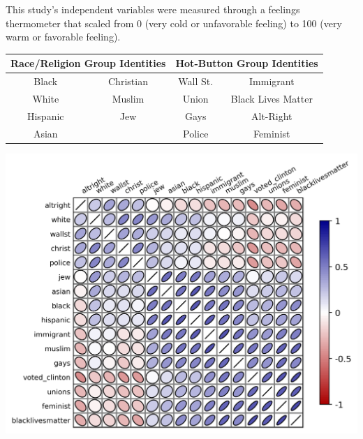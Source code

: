 \documentclass[a0,portrait]{a0poster}
\begin{document}
\begin{multicols}{2}
This study's independent variables were measured through a feelings thermometer that scaled from 0 (very cold or unfavorable feeling) to 100 (very warm or favorable feeling).

\begin{center}
  \begin{tabular}{|cc|cc|} \hline
    \multicolumn{2}{|c|}{\color{DarkMagenta}Race/Religion Group Identities} & \multicolumn{2}{|c|}{\color{CornflowerBlue}Hot-Button Group Identities} \\ \hline
    Black & Christian & Wall St. & Immigrant \\
    White & Muslim &  Union & Black Lives Matter \\
    Hispanic & Jew & Gays & Alt-Right \\
    Asian & & Police & Feminist \\
    \hline
  \end{tabular}
\end{center}

\begin{center}
  \includegraphics[width=1.0\linewidth]{correlation_all.png}
  \label{fig:AllCorrelation}
\end{center}

\vspace{-1cm}

\end{multicols}
\end{document}
